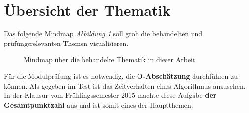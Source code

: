 \section{Übersicht der Thematik}
Das folgende Mindmap \emph{Abbildung \ref{fig:mindmap-thematik}} soll grob die behandelten und prüfungsrelevanten Themen visualisieren.

\begin{figure}[!h]
\centering
	
\caption{Mindmap über die behandelte Thematik in dieser Arbeit.}
\label{fig:mindmap-thematik}
\end{figure}

Für die Modulprüfung ist es notwendig, die \textbf{O-Abschätzung} durchführen zu können. Als gegeben im Test ist das Zeitverhalten eines Algorithmus anzusehen. In der Klausur vom Frühlingssemester 2015 machte diese Aufgabe \textbf{ der Gesamtpunktzahl} aus und ist somit eines der Hauptthemen.